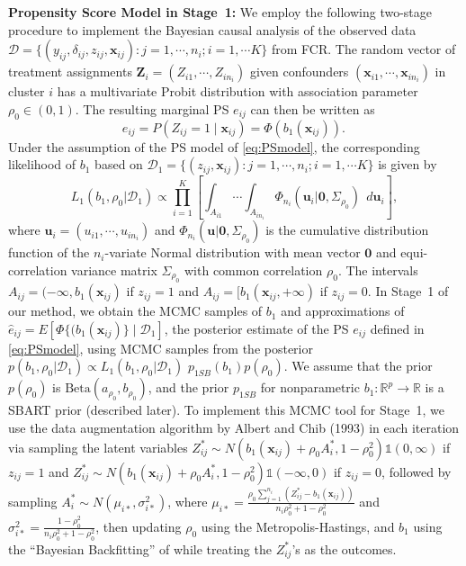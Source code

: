 \documentclass[aoas]{imsart}
\theoremstyle{plain}
\theoremstyle{definition}
\begin{document}
\textbf{Propensity Score Model in Stage~1:}  We employ the following two-stage procedure to implement the Bayesian causal analysis of the observed data $\mathcal{D}=\{(y_{ij},\delta_{ij},z_{ij},\mathbf{x}_{ij}): j=1,\cdots, n_i; i=1,\cdots K\}$ from FCR. 
The random vector of treatment assignments $\mathbf{Z}_i=(Z_{i1},\cdots,Z_{in_i})$ given confounders $(\mathbf{x}_{i1},\cdots,\mathbf{x}_{in_i})$ in cluster $i$ has a multivariate Probit distribution \parencite{Lesaffre1991multivariate} with association parameter  $\rho_0 \in (0,1)$. The  resulting marginal 
PS $e_{ij}$ can then be written as
\begin{equation}
e_{ij}=P(Z_{ij}=1\mid   \mathbf{x}_{ij})
          = \Phi(b_1(\mathbf{x}_{ij})).
\hspace{2pt} 
\label{eq:PSmodel}
\end{equation}
Under the assumption of the PS model of \eqref{eq:PSmodel}, the corresponding likelihood of $b_1$ based on $\mathcal{D}_1=\{(z_{ij},\mathbf{x}_{ij}): j=1,\cdots, n_i; i=1,\cdots K\}$  is given by
\begin{equation}
 L_1(b_1, \rho_0 \vert \mathcal{D}_1)
  \propto \prod_{i=1}^K\left[ \int_{A_{i1}}\cdots \int_{A_{in_i}} \Phi_{n_i}
     (\textbf{u}_i\vert \mathbf{0},\Sigma_{\rho_0})\ \ d\textbf{u}_i\right] ,\label{eq:PSlikelihood}    
\end{equation}
where $\textbf{u}_i=(u_{i1},\cdots,u_{in_i})$ and $\Phi_{n_i}(\mathbf{u}\vert \mathbf{0},\Sigma_{\rho_0})$ is the cumulative distribution function of the $n_i$-variate Normal distribution with mean vector $\mathbf{0}$ and equi-correlation variance matrix $\Sigma_{\rho_0}$ with common correlation $\rho_0$. The intervals $A_{ij}=(-\infty,b_1(\mathbf{x}_{ij})$ if $z_{ij}=1$ and $A_{ij}=[b_1(\mathbf{x}_{ij}, +\infty)$ if $z_{ij}=0$.
In Stage~1 of our method, we obtain the MCMC samples of $b_1$ and approximations of $\hat{e}_{ij} = E[\Phi\{(b_1(\mathbf{x}_{ij})\} \mid \mathcal{D}_1]$, the posterior estimate of the PS $e_{ij}$ defined in \eqref{eq:PSmodel}, using  MCMC samples from the posterior $p(b_1, \rho_0\vert \mathcal{D}_1) \propto L_1(b_1, \rho_0 \vert \mathcal{D}_1)$ $p_{1SB}(b_1)p(\rho_0)$. We assume that the prior $p(\rho_0)$  is $\text{Beta}(a_{\rho_0}, b_{\rho_0})$, and 
the prior $p_{1SB}$ for nonparametric $b_1:\mathbb{R}^p\to \mathbb{R}$ is a SBART prior (described later).
To implement this MCMC tool for Stage~1, we use the data augmentation algorithm by Albert and Chib (1993) \parencite{AlbertJ.H.1993binary} in each iteration via sampling the latent variables $Z_{ij}^* \sim N(b_1(\mathbf{x}_{ij}) + \rho_0 A_i^*, 1-\rho_0^2)\mathds{1}(0, \infty)$ if $z_{ij} = 1$ and $Z_{ij}^* \sim N(b_1(\mathbf{x}_{ij}) + \rho_0 A_i^*, 1-\rho_0^2)\mathds{1}(-\infty, 0)$ if $z_{ij} = 0$, followed by sampling $A_i^*\sim N(\mu_{i*}, \sigma_{i*}^2)$, 
where $\mu_{i*} = \frac{\rho_0 \sum_{j=1}^{n_i}(Z_{ij}^* - b_1(\mathbf{x}_{ij}))}{n_i\rho_0^2 + 1-\rho_0^2}$ and $\sigma_{i*}^2 = \frac{1-\rho_0^2}{n_i\rho_0^2 + 1-\rho_0^2}$,  then updating $\rho_0$ using the Metropolis-Hastings, and  $b_1$ using the ``Bayesian Backfitting'' of \parencite{Chipman10} while treating the $Z_{ij}^*$'s as the outcomes.
\end{document}
